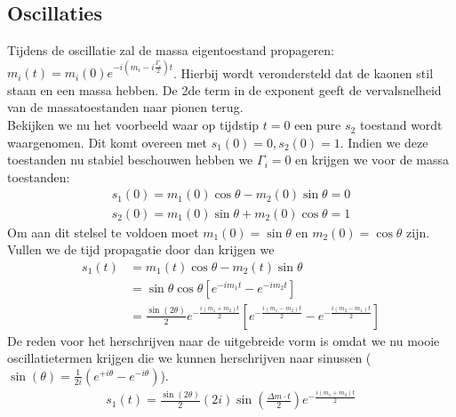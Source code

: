 \documentclass[../main.tex]{subfiles}
\begin{document}
\subsection{Oscillaties}%
\label{sub:oscillaties}

Tijdens de oscillatie zal de massa eigentoestand propageren: $m_{i}(t)=m_{i}(0) e^{-i\left(m_{i}-i \frac{\Gamma_{i}}{2}\right) t}$. Hierbij wordt verondersteld dat de kaonen stil staan en een massa hebben. De 2de term in de exponent geeft de vervalsnelheid van de massatoestanden naar pionen terug.\\
Bekijken we nu het voorbeeld waar op tijdstip $t=0$ een pure $s_2$ toestand wordt waargenomen. Dit komt overeen met $s_{1}(0)=0, s_{2}(0)=1$. Indien we deze toestanden nu stabiel beschouwen hebben we $\Gamma_i = 0$ en krijgen we voor de massa toestanden:
\begin{equation}
    \begin{aligned}
        \label{eq:voorbeeld_osc_stable_massa}
        s_{1}(0)=m_{1}(0) \cos \theta-m_{2}(0) \sin \theta=0 \\
        s_{2}(0)=m_{1}(0) \sin \theta+m_{2}(0) \cos \theta=1
    \end{aligned}
\end{equation}
Om aan dit stelsel te voldoen moet $m_1(0) = \sin\theta$ en $m_2(0) = \cos\theta$ zijn. Vullen we de tijd propagatie door dan krijgen we 
\begin{equation}
    \begin{aligned}
        \label{eq:voorbeeld_osc_stable_massa_tijd_prop_1}
        s_{1}(t) &=m_{1}(t) \cos \theta-m_{2}(t) \sin \theta \\
                 &=\sin \theta \cos \theta\left[e^{-i m_{1} t}-e^{-i m_{2} t}\right] \\
                 &=\frac{\sin (2 \theta)}{2} e^{-\frac{i\left(m_{1}+m_{2}\right) t}{2}}\left[e^{-\frac{i\left(m_{1}-m_{2}\right) t}{2}}-e^{-\frac{i\left(m_{2}-m_{1}\right) t}{2}}\right]
    \end{aligned}
\end{equation}
De reden voor het herschrijven naar de uitgebreide vorm is omdat we nu mooie oscillatietermen krijgen die we kunnen herschrijven naar sinussen ($\sin (\theta) = \frac{1}{2 i}\left(e^{+i \theta}-e^{-i \theta}\right)$).
\begin{equation}
    \begin{aligned}
        \label{eq:voorbeeld_osc_stable_massa_tijd_prop_2}
        s_{1}(t)=\frac{\sin (2 \theta)}{2}(2 i) \sin \left(\frac{\Delta m \cdot t}{2}\right) e^{-\frac{i\left(m_{1}+m_{2}\right) t}{2}}
    \end{aligned}
\end{equation}
\end{document}

